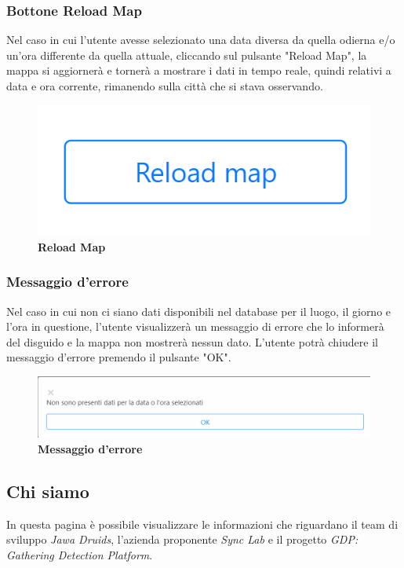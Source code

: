 \subsubsection{Bottone Reload Map} \label{UtilizzoDiGDPGatheringDetecionPlatformContenutoCentralePaginaInizialeHomeBottoneReloadMap}
Nel caso in cui l'utente avesse selezionato una data diversa da quella odierna e/o un'ora differente da quella attuale, cliccando sul pulsante "Reload Map", la mappa si aggiornerà e tornerà a mostrare i dati in tempo reale, quindi relativi a data e ora corrente, rimanendo sulla città che si stava osservando. 
\begin{center}
	\begin{figure}[H]
		\centering\includegraphics[width=0.3\linewidth]{../immagini/manualeUtente/ReloadMap.png}
		\caption{\textbf{Reload Map}}
	\end{figure}
\end{center}

\subsubsection{Messaggio d'errore} \label{UtilizzoDiGDPGatheringDetecionPlatformContenutoCentralePaginaInizialeHomeMessaggioDiErrore}
Nel caso in cui non ci siano dati disponibili nel database per il luogo, il giorno e l'ora in questione, l'utente visualizzerà un messaggio di errore che lo informerà del disguido e la mappa non mostrerà nessun dato. L'utente potrà chiudere il messaggio d'errore premendo il pulsante "OK". 
\begin{center}
	\begin{figure}[H]
		\centering\includegraphics[width=0.5\linewidth]{../immagini/manualeUtente/MessaggioErrore.png}
		\caption{\textbf{Messaggio d'errore}}
	\end{figure}
\end{center}

\subsection{Chi siamo} \label{UtilizzoDiGDPGatheringDetecionPlatformContenutoCentraleChiSiamo}
In questa pagina è possibile visualizzare le informazioni che riguardano il team di sviluppo \textit{Jawa Druids}, l'azienda proponente \textit{Sync Lab} e il progetto \textit{GDP: Gathering Detection Platform}. 


